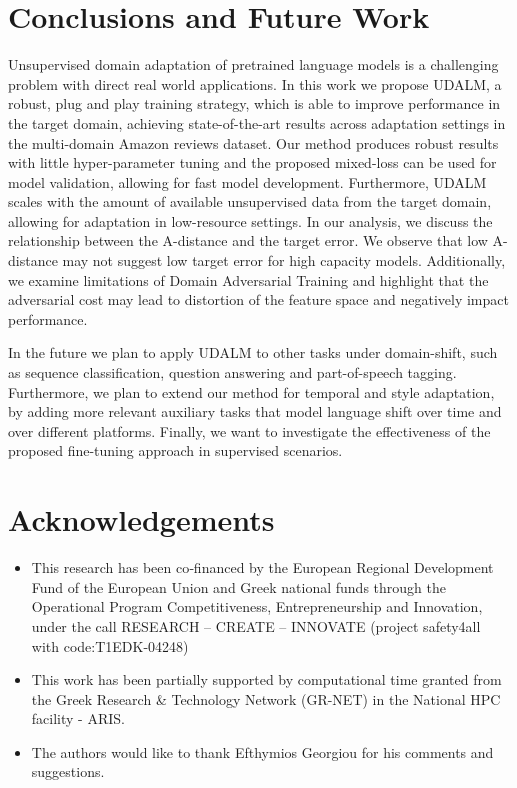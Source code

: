 \documentclass[11pt]{article}
\begin{document}
\section{Conclusions and Future Work}

Unsupervised domain adaptation of pretrained language models is a challenging problem with direct real world applications. 
In this work we propose UDALM, a robust, plug and play training strategy, which is able to improve performance in the target domain, achieving state-of-the-art results across  adaptation settings in the multi-domain Amazon reviews dataset. 
Our method produces robust results with little hyper-parameter tuning and the proposed mixed-loss can be used for model validation, allowing for fast model development.
Furthermore, UDALM scales with the amount of available unsupervised data from the target domain, allowing for adaptation in low-resource settings.
In our analysis, we discuss the relationship between the A-distance and the target error. We observe that low A-distance may not suggest low target error for high capacity models. Additionally, we examine limitations of Domain Adversarial Training and highlight that the adversarial cost may lead to distortion of the feature space and negatively impact performance.


In the future we plan to apply UDALM to other tasks under domain-shift, such as sequence classification, question answering and part-of-speech tagging.
Furthermore, we plan to extend our method for temporal and style adaptation, by adding more relevant auxiliary tasks that model language shift over time and over different platforms. Finally, we want to investigate the effectiveness of the proposed fine-tuning approach in supervised scenarios.

\section*{Acknowledgements}
\begin{itemize}
    \item This research has been co‐financed by the European Regional Development Fund of the European Union and Greek national funds through the Operational Program Competitiveness, Entrepreneurship and Innovation, under the call RESEARCH – CREATE – INNOVATE (project safety4all with code:T1EDK-04248)
    \item This work has been partially supported by computational time granted from the Greek Research \& Technology Network (GR-NET) in the National HPC facility - ARIS.
    \item The authors would like to thank Efthymios Georgiou for his comments and suggestions.
\end{itemize}




\end{document}
